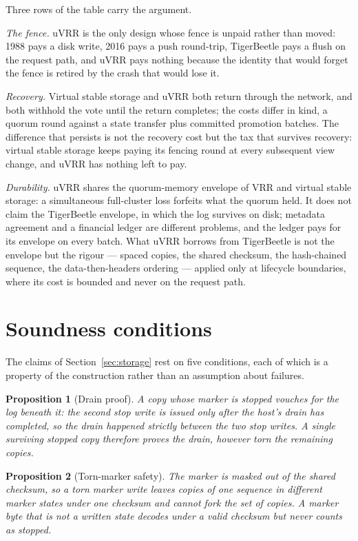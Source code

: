 \documentclass[10pt,journal,letterpaper]{IEEEtran}
\newtheorem{proposition}{Proposition}
\begin{document}
Three rows of the table carry the argument.

\emph{The fence.}
uVRR is the only design whose fence is unpaid rather than moved: 1988 pays a
disk write, 2016 pays a push round-trip, TigerBeetle pays a flush on the
request path, and uVRR pays nothing because the identity that would forget
the fence is retired by the crash that would lose it.

\emph{Recovery.}
Virtual stable storage and uVRR both return through the network, and both
withhold the vote until the return completes; the costs differ in kind, a
quorum round against a state transfer plus committed promotion batches.
The difference that persists is not the recovery cost but the tax that
survives recovery: virtual stable storage keeps paying its fencing round at
every subsequent view change, and uVRR has nothing left to pay.

\emph{Durability.}
uVRR shares the quorum-memory envelope of VRR and virtual stable storage: a
simultaneous full-cluster loss forfeits what the quorum held.
It does not claim the TigerBeetle envelope, in which the log survives on disk;
metadata agreement and a financial ledger are different problems, and the
ledger pays for its envelope on every batch.
What uVRR borrows from TigerBeetle is not the envelope but the rigour ---
spaced copies, the shared checksum, the hash-chained sequence, the
data-then-headers ordering ---
applied only at lifecycle boundaries, where its cost is bounded and never on
the request path.

\section{Soundness conditions}\label{sec:soundness}
The claims of Section~\ref{sec:storage} rest on five conditions, each of
which is a property of the construction rather than an assumption about
failures.

\begin{proposition}[Drain proof]\label{prop:drain}
A copy whose marker is \emph{stopped} vouches for the log beneath it: the
second stop write is issued only after the host's drain has completed, so the
drain happened strictly between the two stop writes.
A single surviving \emph{stopped} copy therefore proves the drain, however
torn the remaining copies.
\end{proposition}

\begin{proposition}[Torn-marker safety]\label{prop:torn}
The marker is masked out of the shared checksum, so a torn marker write
leaves copies of one sequence in different marker states under one checksum
and cannot fork the set of copies.
A marker byte that is not a written state decodes under a valid checksum but
never counts as \emph{stopped}.
\end{proposition}
\end{document}
